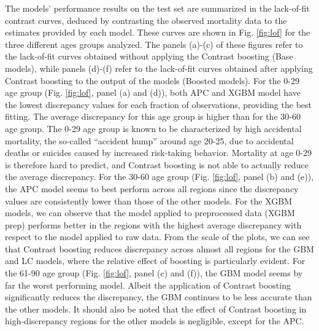 \documentclass[fleqn,10pt]{wlscirep}
\begin{document}
\color{blue} The models' performance results on the test set are summarized in the lack-of-fit contrast curves, deduced by contrasting the observed mortality data to the estimates provided by each model. These curves are shown in Fig. \ref{fig:lof} for the three different ages groups analyzed. The panels (a)-(c) of these figures refer to the lack-of-fit curves obtained without applying the Contrast boosting (Base models), while panels (d)-(f) refer to the lack-of-fit curves obtained after applying Contrast boosting to the output of the models (Boosted models).
For the 0-29 age group (Fig. \ref{fig:lof}, panel (a) and (d)), both APC and XGBM model have the lowest discrepancy values for each fraction of observations, providing the best fitting. The average discrepancy for this age group is higher than for the 30-60 age group. The 0-29 age group is known to be characterized by high accidental mortality, the so-called “accident hump” around age 20-25, due to accidental deaths or suicides caused by increased risk-taking behavior. Mortality at age 0-29 is therefore hard to predict, and Contrast boosting is not able to actually reduce the average discrepancy. \color{black}
For the 30-60 age group (Fig. \ref{fig:lof}, panel (b) and (e)), the APC model seems to best perform across all regions since the discrepancy values are consistently lower than those of the other models. For the XGBM models, we can observe that the model applied to preprocessed data (XGBM prep) performs better in the regions with the highest average discrepancy with respect to the model applied to raw data. From the scale of the plots, we can see that Contrast boosting reduces discrepancy across almost all regions for the GBM and LC models, where the relative effect of boosting is particularly evident. 
For the 61-90 age group (Fig. \ref{fig:lof}, panel (c) and (f)), the GBM model seems by far the worst performing model. 
Albeit the application of Contrast boosting significantly reduces the discrepancy, the GBM continues to be less accurate than the other models. It should also be noted that the effect of Contrast boosting in high-discrepancy regions for the other models is negligible, except for the APC.
\end{document}
